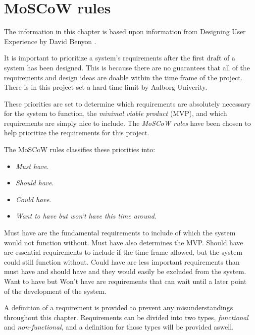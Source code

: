 \section{MoSCoW rules}\label{sec:requirements}
The information in this chapter is based upon information from Designing User Experience by David Benyon \cite{Benyon}.

It is important to prioritize a system's requirements after the first draft of a system has been designed.
This is because there are no guarantees that all of the requirements and design ideas are doable within the time frame of the project.
There is in this project set a hard time limit by Aalborg Univerity.

These priorities are set to determine which requirements are absolutely necessary for the system to function, the \textit{minimal viable product} (MVP), and which requirements are simply nice to include.
The \textit{MoSCoW rules} have been chosen to help prioritize the requirements for this project.

The MoSCoW rules classifies these priorities into:

\begin{itemize}
    \item \textit{Must have}.
    \item \textit{Should have}.
    \item \textit{Could have}.
    \item \textit{Want to have but won’t have this time around}.
\end{itemize}

Must have are the fundamental requirements to include of which the system would not function without.
Must have also determines the MVP.
Should have are essential requirements to include if the time frame allowed, but the system could still function without.
Could have are less important requirements than must have and should have and they would easily be excluded from the system.
Want to have but Won't have are requirements that can wait until a later point of the development of the system.

A definition of a requirement is provided to prevent any misunderstandings throughout this chapter.
Requirements can be divided into two types, \textit{functional} and \textit{non-functional}, and a definition for those types will be provided aswell.

